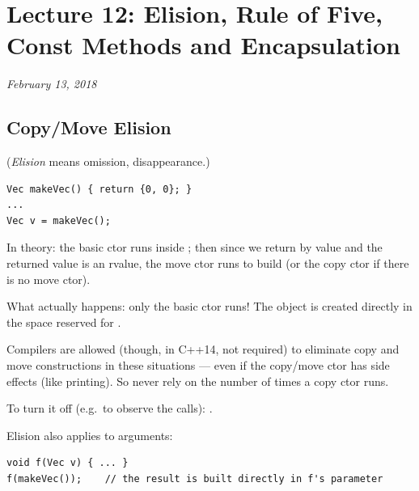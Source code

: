 \chapter{Lecture 12: Elision, Rule of Five, Const Methods and Encapsulation}
\begin{center}
\textit{February 13, 2018}
\end{center}

\section{Copy/Move Elision}
(\emph{Elision} means omission, disappearance.)
\begin{lstlisting}[style=cpp]
Vec makeVec() { return {0, 0}; }
...
Vec v = makeVec();
\end{lstlisting}
In theory: the basic ctor runs inside ; then since we return by
value and the returned value is an rvalue, the move ctor runs to build 
(or the copy ctor if there is no move ctor).

What actually happens: only the basic ctor runs! The object is created directly
in the space reserved for .
\begin{center}
\end{center}

\begin{important}[Elision]
Compilers are allowed (though, in C++14, not required) to eliminate copy and
move constructions in these situations --- even if the copy/move ctor has side
effects (like printing). So never rely on the number of times a copy ctor runs.
\end{important}
To turn it off (e.g.\ to observe the calls): .

Elision also applies to arguments:
\begin{lstlisting}[style=cpp]
void f(Vec v) { ... }
f(makeVec());    // the result is built directly in f's parameter
\end{lstlisting}

